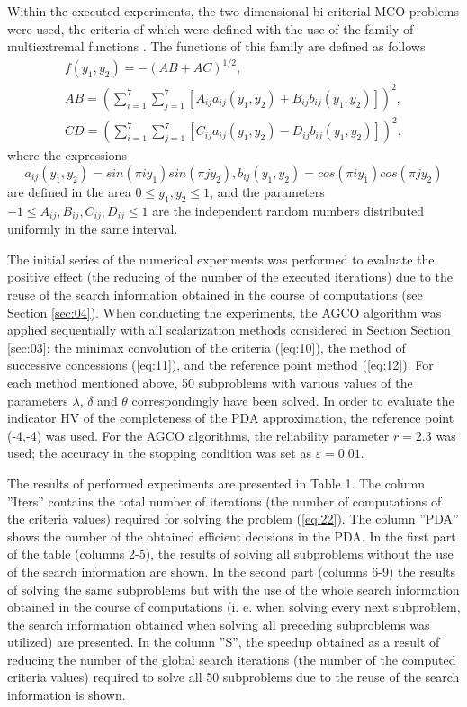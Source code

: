 \documentclass[runningheads]{llncs}
\begin{document}
Within the executed experiments, the two-dimensional bi-criterial MCO problems were used, the criteria of which were defined with the use of the family of multiextremal functions \cite{c11}. The functions of this family are defined as follows
\begin{equation}\label{eq:22}
\begin{split}
f(y_1,y_2 )= -(AB+AC)^{1/2},\\
AB=(\sum_{i=1}^7 {\sum_{j=1}^7{[A_{ij} a_{ij} (y_1,y_2 )+B_{ij} b_{ij} (y_1,y_2 )]}} )^2,\\
CD=(\sum_{i=1}^7 {\sum_{j=1}^7{[C_{ij} a_{ij} (y_1,y_2 )-D_{ij} b_{ij} (y_1,y_2 )]}} )^2,
\end{split}
\end{equation}
where the expressions 
\begin{equation*}
	a_{ij} (y_1, y_2)=sin(\pi iy_1 )  sin(\pi jy_2 ), b_{ij} (y_1,y_2 )=cos(\pi iy_1 ) cos(\pi jy_2 )
\end{equation*}
are defined in the area $0\leq y_1,y_2\leq 1$, and the parameters $-1 \leq A_{ij},B_{ij},C_{ij},D_{ij} \leq 1$ are the independent random numbers distributed uniformly in the same interval.

The initial series of the numerical experiments was performed to evaluate the positive effect (the reducing of the number of the executed iterations) due to the reuse of the search information obtained in the course of computations (see Section \ref{sec:04}). When conducting the experiments, the AGCO algorithm was applied sequentially with all scalarization methods considered in Section Section \ref{sec:03}: the minimax convolution of the criteria (\ref{eq:10}), the method of successive concessions (\ref{eq:11}), and the reference point method (\ref{eq:12}). For each method mentioned above, 50 subproblems with various values of the parameters $\lambda$, $\delta$ and $\theta$ correspondingly have been solved. In order to evaluate the indicator HV of the completeness of the PDA approximation, the reference point (-4,-4) was used. For the AGCO algorithms, the reliability parameter $r=2.3$ was used; the accuracy in the stopping condition was set as $\varepsilon=0.01$.

The results of performed experiments are presented in Table 1. The column ''Iters'' contains the total number of iterations (the number of computations of the criteria values) required for solving the problem (\ref{eq:22}). The column ''PDA'' shows the number of the obtained efficient decisions in the PDA. In the first part of the table (columns 2-5), the results of solving all subproblems without the use of the search information are shown. In the second part (columns 6-9) the results of solving the same subproblems but with the use of the whole search information obtained in the course of computations (i. e. when solving every next subproblem, the search information obtained when solving all preceding subproblems was utilized) are presented. In the column ''S'', the speedup obtained as a result of reducing the number of the global search iterations (the number of the computed criteria values) required to solve all 50 subproblems due to the reuse of the search information is shown.
\end{document}
